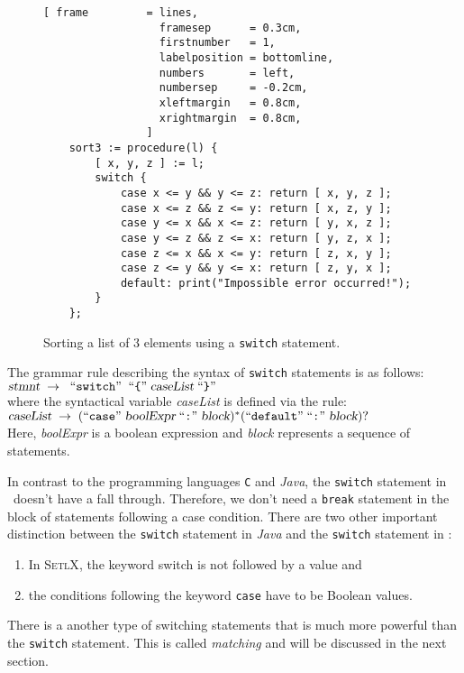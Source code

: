 \begin{figure}[!ht]
\centering
\begin{Verbatim}[ frame         = lines, 
                  framesep      = 0.3cm, 
                  firstnumber   = 1,
                  labelposition = bottomline,
                  numbers       = left,
                  numbersep     = -0.2cm,
                  xleftmargin   = 0.8cm,
                  xrightmargin  = 0.8cm,
                ]
    sort3 := procedure(l) {
        [ x, y, z ] := l;
        switch {
            case x <= y && y <= z: return [ x, y, z ];
            case x <= z && z <= y: return [ x, z, y ];
            case y <= x && x <= z: return [ y, x, z ];
            case y <= z && z <= x: return [ y, z, x ];
            case z <= x && x <= y: return [ z, x, y ];
            case z <= y && y <= x: return [ z, y, x ];
            default: print("Impossible error occurred!");
        }
    };
\end{Verbatim}
\vspace*{-0.3cm}
\caption{Sorting a list of 3 elements using a \texttt{switch} statement.}
\label{fig:sort3switch.stlx}
\end{figure}
\noindent
The grammar rule describing the syntax of \texttt{switch} statements is as follows:
\\[0.2cm]
\hspace*{1.3cm}
$\textsl{stmnt} \;\rightarrow\; \;\mbox{``\texttt{switch}''}\; \;\mbox{``\texttt{\{}''}\; \textsl{caseList} \;\mbox{``\texttt{\}}''}\;$
\\[0.2cm]
where the syntactical variable \textsl{caseList} is defined via the rule:
\\[0.2cm]
\hspace*{1.3cm}
$\textsl{caseList} \;\rightarrow\; (\mbox{``\texttt{case}''}\; \textsl{boolExpr} \;\mbox{``\texttt{:}''}\; \textsl{block})^* 
 (\mbox{``\texttt{default}''} \;\mbox{``\texttt{:}''}\; \textsl{block})?$
\\[0.2cm]
Here, \textsl{boolExpr} is a boolean expression and \textsl{block} represents a sequence of statements.

In contrast to the programming languages \texttt{C} and \textsl{Java}, the \texttt{switch}
statement in \setlx\ doesn't have a fall through.  Therefore, we don't need a \texttt{break} statement in the
block of statements following a case condition.  
There are two other important distinction between the \texttt{switch} statement in
\textsl{Java} and the \texttt{switch} statement in \setlx:  
\begin{enumerate}
\item In \textsc{SetlX}, the keyword switch is not followed by a value and
\item the conditions following the keyword \texttt{case} have to be Boolean values.  
\end{enumerate}
There is a another type of switching
statements that is much more powerful than the \texttt{switch} statement.  This is called
\emph{matching} and will be discussed in the next section.


